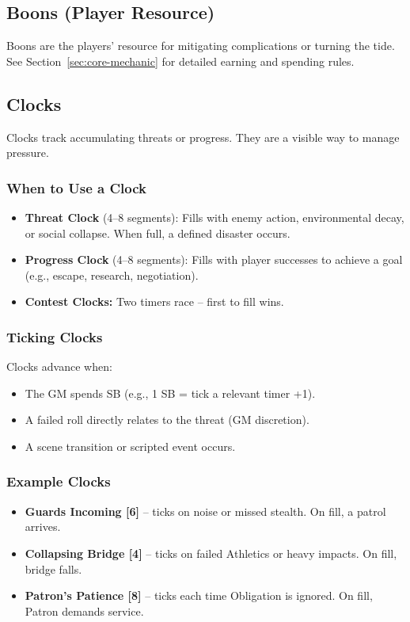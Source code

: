\subsection{Boons (Player Resource)}

Boons are the players' resource for mitigating complications or turning the tide. See Section~\ref{sec:core-mechanic} for detailed earning and spending rules.

\subsection{Clocks}

Clocks track accumulating threats or progress. They are a visible way to manage pressure.

\subsubsection{When to Use a Clock}
\begin{itemize}
  \item \textbf{Threat Clock} (4–8 segments): Fills with enemy action, environmental decay, or social collapse. When full, a defined disaster occurs.
  \item \textbf{Progress Clock} (4–8 segments): Fills with player successes to achieve a goal (e.g., escape, research, negotiation).
  \item \textbf{Contest Clocks:} Two timers race – first to fill wins.
\end{itemize}

\subsubsection{Ticking Clocks}
Clocks advance when:
\begin{itemize}
  \item The GM spends SB (e.g., 1 SB = tick a relevant timer +1).
  \item A failed roll directly relates to the threat (GM discretion).
  \item A scene transition or scripted event occurs.
\end{itemize}

\subsubsection{Example Clocks}
\begin{itemize}
  \item \textbf{Guards Incoming [6]} – ticks on noise or missed stealth. On fill, a patrol arrives.
  \item \textbf{Collapsing Bridge [4]} – ticks on failed Athletics or heavy impacts. On fill, bridge falls.
  \item \textbf{Patron's Patience [8]} – ticks each time Obligation is ignored. On fill, Patron demands service.
\end{itemize}

